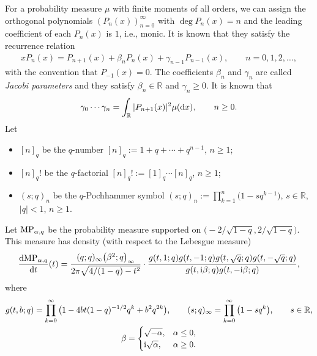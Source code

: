 \documentclass[pdftex]{sigma}
\numberwithin{equation}{section}
\def\R{{\mathbb R}}
\def\i{{\rm i}}
\def\ri{{\rm i}}
\def\qMP{{\rm MP}}
\newcommand{\q}{q}
\begin{document}
For a probability measure $\mu$ with finite moments of all orders, we can assign the orthogonal polynomials $(P_n(x))_{n=0}^\infty$
with $\operatorname{deg} P_n(x) =n$
and the leading coefficient of each $P_n(x)$ is $1$, i.e., monic.
It is known that they satisfy the recurrence relation
\begin{align*} %
	x P_n(x) = P_{n+1}(x) +\beta_n P_n(x) + \gamma_{n-1} P_{n-1}(x),\qquad n =0,1,2,\dots,
\end{align*}
with the convention that $P_{-1}(x)=0$. The coefficients $\beta_n$ and $\gamma_n$ are called \emph{Jacobi parameters} and they satisfy $\beta_n \in \R$ and $\gamma_n \geq 0$.
It is known that
\begin{equation*}%
	\gamma_0 \cdots \gamma_n=\int_{\R}|P_{n+1}(x)|^2\mu({\rm d} x),\qquad n \geq 0.
\end{equation*}
Let
\begin{itemize}\itemsep=0pt
	\item $[n]_q$ be the $q$-number	$[n]_\q:= 1+\q+\cdots+\q^{n-1}$, $n \geq1$;

	\item $[n]_\q!$ be the $\q$-factorial $	[n]_\q !:= [1]_q \cdots [n]_\q$, $n \geq1$;

	\item $(s;\q)_n$ be the $\q$-Pochhammer symbol 	$(s;q)_n:= \prod_{k=1}^n\big(1-s \q^{k-1}\big)$,
$s \in \R$, $|\q|<1$, $n \geq1$.
\end{itemize}

Let $\qMP_{\alpha,q}$ be the probability measure supported on $\bigl(-2/\sqrt{1-q}, 2/\sqrt{1-q}\bigr)$.
This measure has density (with respect to the Lebesgue measure)
\begin{equation}\label{eq10}
\frac{{\rm d} \qMP_{\alpha,q}}{{\rm d}t}(t)= \frac{(q;q)_\infty\big(\beta^2; q\big)_\infty}{2\pi\sqrt{4/(1-q) -t^2}}\cdot\frac{g(t,1;q) g(t,-1;q) g(t,\sqrt{q};q) g(t,-\sqrt{q};q)}{g(t, \i \beta;q)g(t,-\i \beta;q)},
\end{equation}
where
\begin{gather*}
g(t,b;q)= \prod_{k=0}^\infty\big(1-4 b t (1-q)^{-1/2} q^k + b^2 q^{2k}\big), \qquad
	(s;q)_\infty=\prod_{k=0}^\infty\big(1-s q^{k}\big),\qquad s \in \R,
\\
\beta
	=
	\begin{cases}
		\sqrt{-\alpha}, & \alpha \leq 0, \\
		\ri \sqrt{\alpha}, & \alpha \geq0.
	\end{cases}
\end{gather*}
\end{document}
